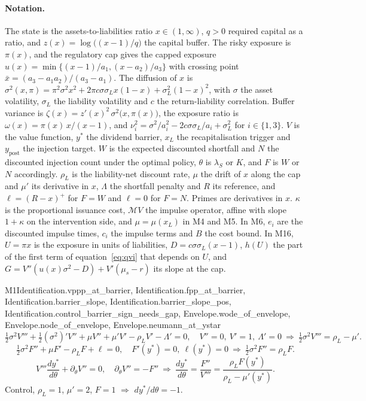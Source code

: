 \paragraph{Notation.} The state is the assets-to-liabilities ratio
$x\in(1,\infty)$, $q>0$ required capital as a ratio, and
$z(x)=\log\big((x-1)/q\big)$ the capital buffer. The risky exposure is $\pi(x)$,
and the regulatory cap gives the capped exposure
$u(x)=\min\{(x-1)/a_1,(x-a_2)/a_3\}$ with crossing point
$\bar x=(a_3-a_1a_2)/(a_3-a_1)$. The diffusion of $x$ is
$\sigma^2(x,\pi)=\pi^2\sigma^2x^2+2\pi c\sigma\sigma_Lx(1-x)+\sigma_L^2(1-x)^2$,
with $\sigma$ the asset volatility, $\sigma_L$ the liability volatility and $c$
the return-liability correlation. Buffer variance is
$\zeta(x)=z'(x)^2\,\sigma^2\big(x,\pi(x)\big)$, the exposure ratio is
$\omega(x)=\pi(x)\,x/(x-1)$, and
$\nu_i^2=\sigma^2/a_i^2-2c\sigma\sigma_L/a_i+\sigma_L^2$ for $i\in\{1,3\}$.
$V$ is the value function, $y^*$ the dividend barrier, $x_L$ the
recapitalisation trigger and $y_{\text{post}}$ the injection target. $W$ is the
expected discounted shortfall and $N$ the discounted injection count under the
optimal policy, $\theta$ is $\lambda_S$ or $K$, and $F$ is $W$ or $N$
accordingly. $\rho_L$ is the liability-net discount rate, $\mu$ the drift of
$x$ along the cap and $\mu'$ its derivative in $x$, $\Lambda$ the shortfall
penalty and $R$ its reference, and $\ell=(R-x)^+$ for $F=W$ and $\ell=0$ for
$F=N$. Primes are derivatives in $x$. $\kappa$ is the proportional issuance
cost, $\mathcal MV$ the impulse operator, affine with slope $1+\kappa$ on the
intervention side, and $\mu=\mu(x_L)$ in M4 and M5. In M6, $e_i$ are the
discounted impulse times, $c_i$ the impulse terms and $B$ the cost bound. In M16,
$U=\pi x$ is the exposure in units of liabilities, $D=c\sigma\sigma_L(x-1)$,
$h(U)$ the part of the first term of equation~\eqref{eq:qvi} that depends on $U$,
and $G=V''(u(x)\sigma^2-D)+V'(\mu_s-r)$ its slope at the cap.

\begin{mproof}{M1}{Identification.vppp_at_barrier, Identification.fpp_at_barrier, Identification.barrier_slope, Identification.barrier_slope_pos, Identification.control_barrier_sign_needs_gap, Envelope.wode_of_envelope, Envelope.node_of_envelope, Envelope.neumann_at_ystar}
\[ \tfrac12\sigma^2V'''+\tfrac12(\sigma^2)'V''+\mu V''+\mu'V'-\rho_LV'-\Lambda'=0,\quad V''=0,\ V'=1,\ \Lambda'=0\ \Rightarrow\ \tfrac12\sigma^2V'''=\rho_L-\mu' . \]
\[ \tfrac12\sigma^2F''+\mu F'-\rho_LF+\ell=0,\quad F'(y^*)=0,\ \ell(y^*)=0\ \Rightarrow\ \tfrac12\sigma^2F''=\rho_LF . \]
\[ V'''\frac{dy^*}{d\theta}+\partial_\theta V''=0,\quad \partial_\theta V''=-F''\ \Rightarrow\ \frac{dy^*}{d\theta}=\frac{F''}{V'''}=\frac{\rho_LF(y^*)}{\rho_L-\mu'(y^*)} . \]
Control, $\rho_L=1$, $\mu'=2$, $F=1$ $\Rightarrow$ $dy^*/d\theta=-1$.
\end{mproof}

